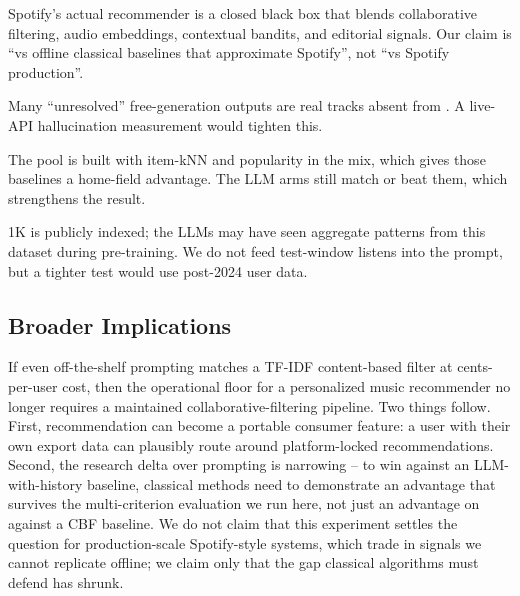  Spotify's actual recommender is a closed black box that blends collaborative filtering, audio embeddings, contextual bandits, and editorial signals. Our claim is ``vs offline classical baselines that approximate Spotify'', not ``vs Spotify production''.

 Many ``unresolved'' free-generation outputs are real tracks absent from \spotcat. A live-API hallucination measurement would tighten this.

 The pool is built with item-kNN and popularity in the mix, which gives those baselines a home-field advantage. The LLM arms still match or beat them, which strengthens the result.

 \lastfm 1K is publicly indexed; the LLMs may have seen aggregate patterns from this dataset during pre-training. We do not feed test-window listens into the prompt, but a tighter test would use post-2024 user data.

\subsection{Broader Implications}

If even off-the-shelf prompting matches a TF-IDF content-based filter at cents-per-user cost, then the operational floor for a personalized music recommender no longer requires a maintained collaborative-filtering pipeline. Two things follow. First, recommendation can become a portable consumer feature: a user with their own export data can plausibly route around platform-locked recommendations. Second, the research delta over prompting is narrowing -- to win against an LLM-with-history baseline, classical methods need to demonstrate an advantage that survives the multi-criterion evaluation we run here, not just an advantage on \recall against a CBF baseline. We do not claim that this experiment settles the question for production-scale Spotify-style systems, which trade in signals we cannot replicate offline; we claim only that the gap classical algorithms must defend has shrunk.
